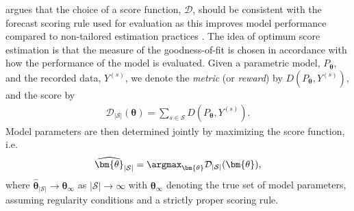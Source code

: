 \citet{Gneiting2007} argues that the choice of a score function, $\mathcal{D}$, should be consistent with the forecast scoring rule used for evaluation as this improves model performance compared to non-tailored estimation practices \citep{friedman1983a,Copas1983}. 
The idea of optimum score estimation is that the measure of the goodness-of-fit is chosen in accordance with how the performance of the model is evaluated. 
Given a parametric model, $P_{\bm{\theta}}$, and the recorded data, $Y^{(s)}$, we denote the \textit{metric} (or \textit{reward}) by $D(P_{\bm{\theta}}, Y^{(s)})$, and the score by
\begin{align}
    \mathcal{D}_{|\mathcal{S}|}(\bm{\theta}) = \sum_{s \in \mathcal{S}} D\left(P_{\bm{\theta}}, Y^{(s)}\right). %
    \label{eq:mean_score}
\end{align}
Model parameters are then determined jointly by maximizing the score function, i.e.
$$\widehat{\bm{\theta}}_{|\mathcal{S}|} = \argmax_{\bm{\theta}}\mathcal{D}_{|\mathcal{S}|}(\bm{\theta}), $$
where $\widehat{\bm{\theta}}_{|\mathcal{S}|}  \rightarrow \bm{\theta}_{\infty}$ as $|\mathcal{S}| \rightarrow \infty$ with $\bm{\theta}_{\infty}$ denoting the true set of model parameters, assuming regularity conditions and a strictly proper scoring rule.

